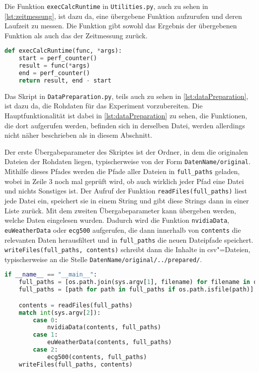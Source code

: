 Die Funktion \lstinline|execCalcRuntime| in \texttt{Utilities.py}, auch zu sehen in \autoref{lst:zeitmessung}, ist dazu da, eine übergebene Funktion aufzurufen und deren Laufzeit zu messen. Die Funktion gibt sowohl das Ergebnis der übergebenen Funktion als auch das der Zeitmessung zurück.
\begin{lstlisting}[caption=Funktion zur Zeitmessung, language=Python, label=lst:zeitmessung, style=Python]
def execCalcRuntime(func, *args):
    start = perf_counter()
    result = func(*args)
    end = perf_counter()
    return result, end - start
\end{lstlisting}

Das Skript in \texttt{DataPreparation.py}, teils auch zu sehen in \autoref{lst:dataPreparation}, ist dazu da, die Rohdaten für das Experiment vorzubereiten. Die Hauptfunktionalität ist dabei in \autoref{lst:dataPreparation} zu sehen, die Funktionen, die dort aufgerufen werden, befinden sich in derselben Datei, werden allerdings nicht näher beschrieben als in diesem Abschnitt.

Der erste Übergabeparameter des Skriptes ist der Ordner, in dem die originalen Dateien der Rohdaten liegen, typischerweise von der Form \texttt{DatenName/original}. Mithilfe dieses Pfades werden die Pfade aller Dateien in \lstinline|full_paths| geladen, wobei in Zeile 3 noch mal geprüft wird, ob auch wirklich jeder Pfad eine Datei und nichts Sonstiges ist. Der Aufruf der Funktion \lstinline|readFiles(full_paths)| liest jede Datei ein, speichert sie in einem String und gibt diese Strings dann in einer Liste zurück. Mit dem zweiten Übergabeparameter kann übergeben werden, welche Daten eingelesen wurden. Dadurch wird die Funktion \lstinline[breaklines=false]|nvidiaData|, \lstinline[breaklines=false]|euWeatherData| oder \lstinline[breaklines=false]|ecg500| aufgerufen, die dann innerhalb von \lstinline[breaklines=false]|contents| die relevanten Daten herausfiltert und in \lstinline|full_paths| die neuen Dateipfade speichert. \lstinline|writeFiles(full_paths, contents)| schreibt dann die Inhalte in csv"=Dateien, typischerweise an die Stelle \texttt{DatenName/original/../prepared/}.
\begin{lstlisting}[caption=Vorverarbeitung der Daten, language=Python, label=lst:dataPreparation, style=Python]
if __name__ == "__main__":
    full_paths = [os.path.join(sys.argv[1], filename) for filename in os.listdir(sys.argv[1])]
    full_paths = [path for path in full_paths if os.path.isfile(path)]

    contents = readFiles(full_paths)
    match int(sys.argv[2]):
        case 0:
            nvidiaData(contents, full_paths)
        case 1:
            euWeatherData(contents, full_paths)
        case 2:
            ecg500(contents, full_paths)
    writeFiles(full_paths, contents)
\end{lstlisting}

